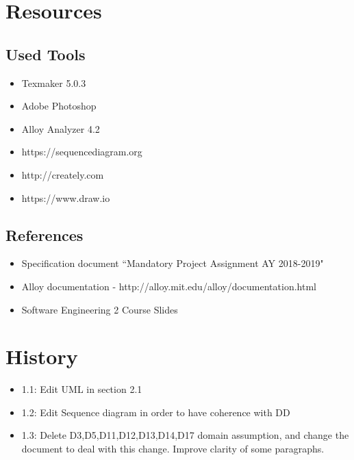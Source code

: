 \documentclass{article}
\begin{document}
\section{Resources}
\subsection{Used Tools}
\begin{itemize}
\item Texmaker 5.0.3
\item Adobe Photoshop
\item Alloy Analyzer 4.2
\item https://sequencediagram.org
\item http://creately.com
\item https://www.draw.io
\end{itemize}
\subsection{References}
\begin{itemize}
\item Specification document “Mandatory Project Assignment AY 2018-2019"
\item Alloy documentation - http://alloy.mit.edu/alloy/documentation.html
\item Software Engineering 2 Course Slides
\end{itemize}
\newpage
\section{ History}
\begin{itemize}
\item 1.1: Edit UML in section 2.1
\item 1.2: Edit Sequence diagram in order to have coherence with DD
\item 1.3: Delete D3,D5,D11,D12,D13,D14,D17 domain assumption, and change the document to deal with this change. Improve clarity of some paragraphs.
\end{itemize}
\end{document}
